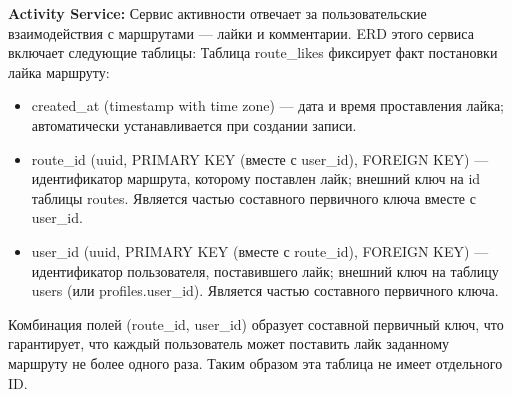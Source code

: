 \textbf{Activity Service:} Сервис активности отвечает за пользовательские взаимодействия с маршрутами — лайки и комментарии. ERD этого сервиса включает следующие таблицы:
Таблица route\_likes фиксирует факт постановки лайка маршруту:
\begin{itemize}
    \item created\_at (timestamp with time zone) — дата и время проставления лайка; автоматически устанавливается при создании записи.
    \item route\_id (uuid, PRIMARY KEY (вместе с user\_id), FOREIGN KEY) — идентификатор маршрута, которому поставлен лайк; внешний ключ на id таблицы routes. Является частью составного первичного ключа вместе с user\_id.
    \item user\_id (uuid, PRIMARY KEY (вместе с route\_id), FOREIGN KEY) — идентификатор пользователя, поставившего лайк; внешний ключ на таблицу users (или profiles.user\_id). Является частью составного первичного ключа.
\end{itemize}
\noindent Комбинация полей (route\_id, user\_id) образует составной первичный ключ, что гарантирует, что каждый пользователь может поставить лайк заданному маршруту не более одного раза. Таким образом эта таблица не имеет отдельного ID.

